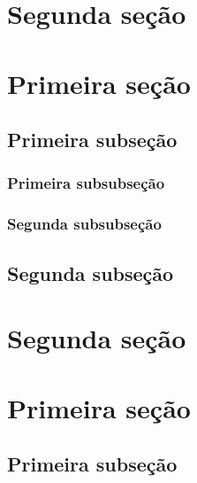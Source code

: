 \documentclass[a4paper,12pt,oneside,onecolumn]{uerj/uerj}
\begin{document}
\section{Segunda seção}


\annex


\section{Primeira seção}

\subsection{Primeira subseção}

\subsubsection{Primeira subsubseção}

\subsubsection{Segunda subsubseção}

\subsection{Segunda subseção}

\section{Segunda seção}


\section{Primeira seção}

\subsection{Primeira subseção}
\end{document}
